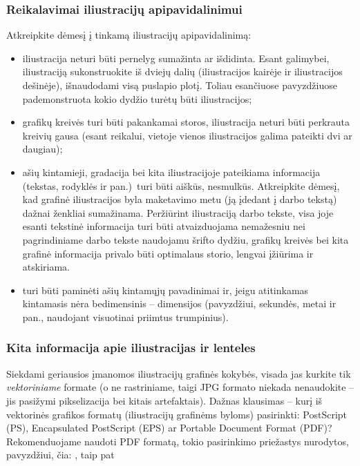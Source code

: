 \documentclass[a4paper,12pt]{article}
\begin{document}
\subsubsection{Reikalavimai iliustracijų apipavidalinimui}

Atkreipkite dėmesį į tinkamą iliustracijų apipavidalinimą:
\begin{itemize}[ noitemsep, topsep=5pt ]

\item
iliustracija neturi būti pernelyg sumažinta ar išdidinta.
Esant galimybei, iliustraciją sukonstruokite iš dviejų dalių (iliustracijos kairėje ir iliustracijos dešinėje), išnaudodami visą puslapio plotį.
Toliau esančiuose pavyzdžiuose pademonstruota kokio dydžio turėtų būti iliustracijos;

\item
grafikų kreivės turi būti pakankamai storos, iliustracija neturi būti perkrauta kreivių gausa (esant reikalui, vietoje vienos iliustracijos galima pateikti dvi ar daugiau);

\item
ašių kintamieji, gradacija bei kita iliustracijoje pateikiama informacija (tekstas, rodyklės ir pan.)\ turi būti aiškūs, nesmulkūs.
Atkreipkite dėmesį, kad grafinė iliustracijos byla maketavimo metu (ją įdedant į darbo tekstą) dažnai ženkliai sumažinama.
Peržiūrint iliustraciją darbo tekste, visa joje esanti tekstinė informacija turi būti atvaizduojama nemažesniu nei pagrindiniame darbo tekste naudojamu šrifto dydžiu,
grafikų kreivės bei kita grafinė informacija privalo būti optimalaus storio, lengvai įžiūrima ir atskiriama.

\item
turi būti paminėti ašių kintamųjų pavadinimai ir, jeigu atitinkamas kintamasis nėra bedimensinis -- dimensijos
(pavyzdžiui, sekundės, metai ir pan., naudojant visuotinai priimtus trumpinius).
\end{itemize}

\subsubsection{Kita informacija apie iliustracijas ir lenteles}

Siekdami geriausios įmanomos iliustracijų grafinės kokybės, visada jas kurkite tik \emph{vektoriniame} formate
(o ne rastriniame, taigi JPG formato niekada nenaudokite -- jis pasižymi pikselizacija bei kitais artefaktais).
Dažnas klausimas -- kurį iš vektorinės grafikos formatų (iliustracijų grafinėms byloms) pasirinkti: PostScript (PS), Encapsulated PostScript (EPS) ar Portable Document Format (PDF)?
Rekomenduojame naudoti PDF formatą, tokio pasirinkimo priežastys nurodytos, pavyzdžiui, čia:
, taip pat
\end{document}
